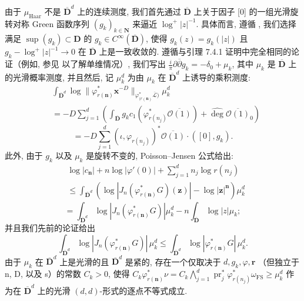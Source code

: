 由于 \(\mu_{\text{Haar}}\) 不是 \(\overline{\mathbf{D}}^d\) 上的连续测度, 我们首先通过 \(\overline{\mathbf{D}}\) 上关于因子 [0] 的一组光滑旋转对称 Green 函数序列 \((g_k)_{k\in\mathbf{N}}\) 
来逼近 \(\log^+|z|^{-1}\). 
具体而言, 遵循 \cite[第 268 页]{Bos20}, 我们选择满足 \(\sup (g_k) \subset \mathbf{D}\) 
的 \(g_k \in C^{\infty}(\overline{\mathbf{D}})\), 
使得 \(g_k(z) = g_k(|z|)\) 且 \(g_k - \log^+|z|^{-1} \to 0\) 在 \(\overline{\mathbf{D}}\) 上是一致收敛的. 
遵循与引理 7.4.1 证明中完全相同的论证（例如, 参见 \cite[第 270--271 页]{Bos20} 以了解单维情况）, 
我们写出 \(\frac{i}{\pi}\partial \overline{\partial} g_k = -\delta_0 + \mu_k\), 
其中 \(\mu_k\) 是 \(\overline{\mathbf{D}}\) 上的光滑概率测度, 
并且然后, 记 \(\mu_k^d\) 为由 \(\mu_k\) 在 \(\overline{\mathbf{D}}^d\) 上诱导的乘积测度:
\[
\begin{aligned}
&\int_{\overline{\mathbf{D}}^d} \log \|\varphi_{r(\mathbf{n})}^* \mathbf{x}^{-D}\|_{\varphi_{(r(\mathbf{n})}^* \overline{\mathcal{L}})} \mu_k^d \\
&= -D \sum_{j=1}^d \left( \int_{\overline{\mathbf{D}}} g_k c_1(\varphi_{r(n_j)}^* \overline{\mathcal{O}(1)}) + \widehat{\operatorname{deg}} \overline{\mathcal{O}(1)}_0 \right)
\end{aligned}
\]
\[ = -D \sum_{j=1}^d (\iota, \varphi_{r(n_j)})^* \overline{\mathcal{O}(1)} \cdot ([0], g_k). \]
此外, 由于 \(g_k\) 以及 \(\mu_k\) 是旋转不变的, Poisson--Jensen 公式给出:
\[
\begin{aligned}
&\log |c_{\mathbf{n}}| + n \log |\varphi'(0)| + \sum_{j=1}^{d} n_{j} \log r(n_{j}) \\
&\leq \int_{\overline{\mathbf{D}}^{d}} \left( \log |J_{n}(\varphi_{r(\mathbf{n})}^{*}G)(\mathbf{z})| - \log |\mathbf{z}|^{\mathbf{n}} \right) \mu_{k}^{d}
\end{aligned}
\]
\[ = \int_{\overline{\mathbf{D}}^{d}} \log |J_{n}(\varphi_{r(\mathbf{n})}^{*}G)| \mu_{k}^{d} - n \int_{\overline{\mathbf{D}}} \log |z| \mu_{k}; \]
并且我们先前的论证给出
\[ \int_{\overline{\mathbf{D}}^d} \log |J_n(\varphi_{r(\mathbf{n})}^*G)| \, \mu_k^d \le \int_{\overline{\mathbf{D}}^d} \log |\varphi_{r(\mathbf{n})}^*G| \, \mu_k^d. \]
由于 \(\mu_k\) 在 \(\overline{\mathbf{D}}^d\) 上是光滑的且 \(\overline{\mathbf{D}}^d\) 是紧的, 
存在一个仅取决于 \(d, g_k, \varphi, \mathbf{r}\) （但独立于 n, D, 以及 s）的常数 \(C_k > 0\), 
使得 \(C_k \varphi_{r(\mathbf{n})}^* \nu = C_k \bigwedge_{j=1}^d \operatorname{pr}_j^* \varphi_{r(n_j)}^* \omega_{\mathrm{FS}} \ge \mu_k^d\) 
作为在 \(\overline{\mathbf{D}}^d\) 上的光滑 \((d, d)\)-形式的逐点不等式成立.

